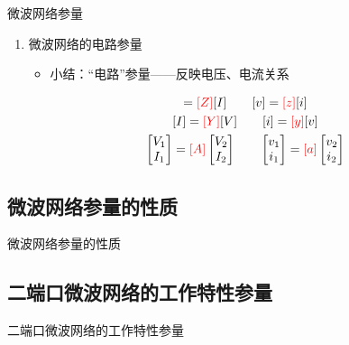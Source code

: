 \begin{frame}{微波网络参量}
    \begin{enumerate}
        \item 微波网络的电路参量
        \begin{itemize}
            \item 小结：“电路”参量——反映电压、电流关系
        \end{itemize}
        \begin{gather*}
            [V]={\color{red}{[Z]}}[I] \qquad [v]={\color{red}{[z]}}[i] \\
            [I]={\color{red}{[Y]}}[V] \qquad [i]={\color{red}{[y]}}[v] \\
            \begin{bmatrix*}
                V_1 \\
                I_1 \\
            \end{bmatrix*}={\color{red}{[A]}}
            \begin{bmatrix*}
                V_2 \\
                I_2 \\
            \end{bmatrix*} \qquad
            \begin{bmatrix*}
                v_1 \\
                i_1 \\
            \end{bmatrix*}={\color{red}{[a]}}
            \begin{bmatrix*}
                v_2 \\
                i_2 \\
            \end{bmatrix*}
        \end{gather*}
    \end{enumerate}
\end{frame}

\subsection{微波网络参量的性质}
\begin{frame}{微波网络参量的性质}

\end{frame}

\subsection{二端口微波网络的工作特性参量}
\begin{frame}{二端口微波网络的工作特性参量}

\end{frame}

